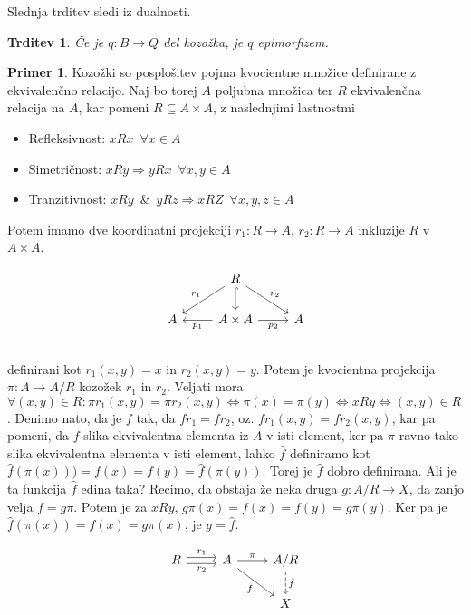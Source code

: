 \documentclass[12pt,a4paper]{book}
\theoremstyle{definition}
\theoremstyle{plain}
\newtheorem{trditev}[definicija]{Trditev}
\theoremstyle{definition}
\newtheorem{primer}{Primer}[section]
\theoremstyle{remark}
\begin{document}
Slednja trditev sledi iz dualnosti.

\begin{trditev}
Če je $q : B \to Q$ del kozožka, je $q$ epimorfizem.
\end{trditev}

\begin{primer}
Kozožki so posplošitev pojma kvocientne množice definirane z ekvivalenčno relacijo. Naj bo torej $A$ poljubna množica ter $R$ ekvivalenčna relacija na $A$, kar pomeni $R \subseteq A \times A$, z naslednjimi lastnostmi
\begin{itemize}
\item Refleksivnost: $xRx \enspace \forall x \in A$
\item Simetričnost: $xRy \Rightarrow yRx \enspace \forall x,y \in A$
\item Tranzitivnost: $xRy \enspace\&\enspace yRz \Rightarrow xRZ \enspace \forall x,y,z \in A$
\end{itemize}
Potem imamo dve koordinatni projekciji $r_1 : R \to A$, $r_2 : R \to A$ inkluzije $R$ v $A \times A$.

$$\begin{tikzcd}
& R \ar[dl, "r_1"'] \ar[d, hook] \ar[dr, "r_2"] & \\
A & A \times A \ar[l, "p_1"] \ar[r, "p_2"'] & A \\
\end{tikzcd}$$
definirani kot $r_1(x,y) = x$ in $r_2(x,y) = y$. Potem je kvocientna projekcija $\pi : A \to A/R$ kozožek $r_1$ in $r_2$.
Veljati mora $\forall (x,y) \in R : \pi r_1(x,y) = \pi r_2(x,y) \Leftrightarrow \pi(x) = \pi(y) \Leftrightarrow xRy \Leftrightarrow (x,y) \in R$. Denimo nato, da je $f$ tak, da $fr_1 = fr_2$, oz. $fr_1(x,y) = fr_2(x,y) $, kar pa pomeni, da $f$ slika ekvivalentna elementa iz $A$ v isti element, ker pa $\pi$  ravno tako slika ekvivalentna elementa v isti element, lahko $\hat{f}$ definiramo kot $\hat{f}(\pi(x)) ) = f(x) = f(y) = \hat{f}(\pi(y))$. Torej je $\hat{f}$ dobro definirana. Ali je ta funkcija $\hat{f}$ edina taka? Recimo, da obstaja že neka druga $g : A/R \to X$, da zanjo velja $f = g\pi$. Potem je za $xRy$, $g\pi(x) = f(x) = f(y) = g\pi(y)$. Ker pa je $\hat{f}(\pi(x)) = f(x) = g\pi(x)$, je $g = \hat{f}$.

$$\begin{tikzcd}
R \ar[r, shift left, "r_1"] \ar[r, shift right, "r_2"'] & A \ar[r, "\pi"] \ar[dr, "f"'] & A/R \ar[d, dashed, "\hat{f}"] \\
& & X \\
\end{tikzcd}$$

\end{primer}
\end{document}
